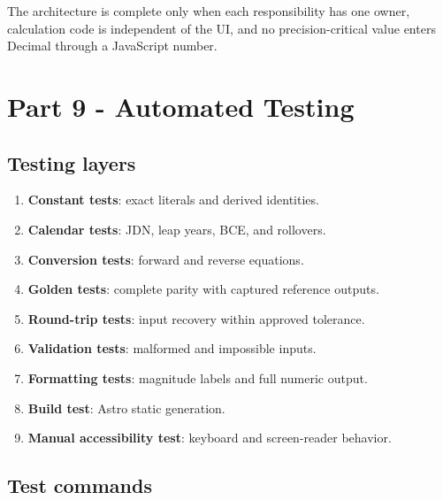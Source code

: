 \documentclass[11pt,letterpaper]{article}
\begin{document}
\begin{checkpointbox}
The architecture is complete only when each responsibility has one owner,
calculation code is independent of the UI, and no precision-critical value
enters Decimal through a JavaScript number.
\end{checkpointbox}

\section{Part 9 - Automated Testing}

\subsection{Testing layers}

\begin{enumerate}
    \item \textbf{Constant tests}: exact literals and derived identities.
    \item \textbf{Calendar tests}: JDN, leap years, BCE, and rollovers.
    \item \textbf{Conversion tests}: forward and reverse equations.
    \item \textbf{Golden tests}: complete parity with captured reference outputs.
    \item \textbf{Round-trip tests}: input recovery within approved tolerance.
    \item \textbf{Validation tests}: malformed and impossible inputs.
    \item \textbf{Formatting tests}: magnitude labels and full numeric output.
    \item \textbf{Build test}: Astro static generation.
    \item \textbf{Manual accessibility test}: keyboard and screen-reader behavior.
\end{enumerate}

\subsection{Test commands}

\end{document}
